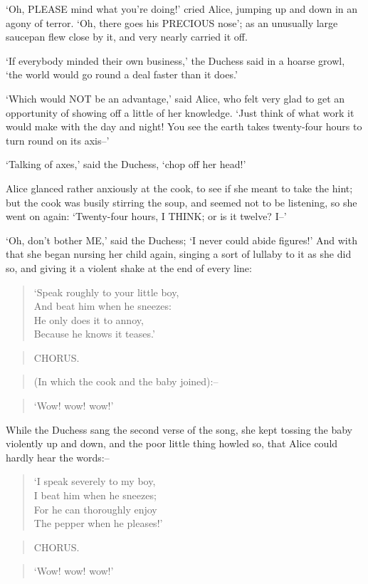 \documentclass[12pt]{book}
\begin{document}
  `Oh, PLEASE mind what you're doing!' cried Alice, jumping up
and down in an agony of terror.  `Oh, there goes his PRECIOUS
nose'; as an unusually large saucepan flew close by it, and very
nearly carried it off.

  `If everybody minded their own business,' the Duchess said in a
hoarse growl, `the world would go round a deal faster than it
does.'

  `Which would NOT be an advantage,' said Alice, who felt very
glad to get an opportunity of showing off a little of her
knowledge.  `Just think of what work it would make with the day
and night!  You see the earth takes twenty-four hours to turn
round on its axis--'

  `Talking of axes,' said the Duchess, `chop off her head!'

  Alice glanced rather anxiously at the cook, to see if she meant
to take the hint; but the cook was busily stirring the soup, and
seemed not to be listening, so she went on again:  `Twenty-four
hours, I THINK; or is it twelve?  I--'

  `Oh, don't bother ME,' said the Duchess; `I never could abide
figures!'  And with that she began nursing her child again,
singing a sort of lullaby to it as she did so, and giving it a
violent shake at the end of every line:

\begin{verse}
        `Speak roughly to your little boy,\\
          And beat him when he sneezes:\\
        He only does it to annoy,\\
          Because he knows it teases.'
\end{verse}
\begin{verse}
                    CHORUS.
\end{verse}
\begin{verse}
    (In which the cook and the baby joined):--
\end{verse}
\begin{verse}
                `Wow! wow! wow!'
\end{verse}

  While the Duchess sang the second verse of the song, she kept
tossing the baby violently up and down, and the poor little thing
howled so, that Alice could hardly hear the words:--

\begin{verse}
        `I speak severely to my boy,\\
          I beat him when he sneezes;\\
        For he can thoroughly enjoy\\
          The pepper when he pleases!'
\end{verse}
\begin{verse}
                    CHORUS.
\end{verse}
\begin{verse}
                `Wow! wow! wow!'
\end{verse}
\end{document}
